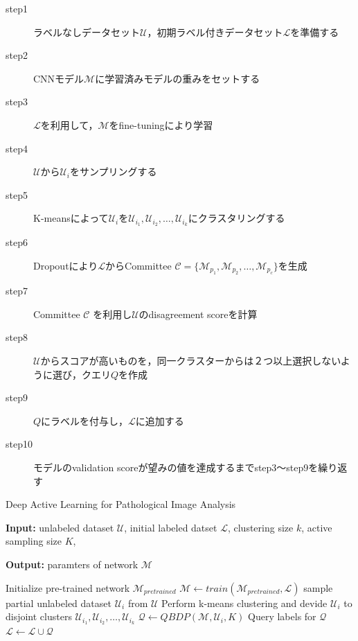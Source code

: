 \begin{description}
    \item[step1] ラベルなしデータセット$\mathcal{U}$，初期ラベル付きデータセット$\mathcal{L}$を準備する
    \item[step2] CNNモデル$\mathcal{M}$に学習済みモデルの重みをセットする
    \item[step3] $\mathcal{L}$を利用して，$\mathcal{M}$をfine-tuningにより学習
    \item[step4] $\mathcal{U}$から$\mathcal{U}_i$をサンプリングする
    \item[step5] K-meansによって$\mathcal{U}_i$を$\mathcal{U}_{i_1}, \mathcal{U}_{i_2}, \dots, \mathcal{U}_{i_k}$にクラスタリングする
    \item[step6] Dropoutにより$\mathcal{L}$からCommittee $\mathcal{C} = \{\mathcal{M}_{p_1}, \mathcal{M}_{p_2}, \dots, \mathcal{M}_{p_c} \}$を生成
    \item[step7] Committee $\mathcal{C}$ を利用し$\mathcal{U}$のdisagreement scoreを計算
    \item[step8] $\mathcal{U}$からスコアが高いものを，同一クラスターからは２つ以上選択しないように選び，クエリ$Q$を作成
    \item[step9] $Q$にラベルを付与し，$\mathcal{L}$に追加する
    \item[step10] モデルのvalidation scoreが望みの値を達成するまでstep3〜step9を繰り返す
\end{description}


\begin{algorithm}[h]
    \caption{Deep Active Learning for Pathological Image Analysis}
    \label{algo:dal}
    \begin{algorithmic}
        \STATE \textbf{Input: } 
        unlabeled dataset $\mathcal{U}$,
        initial labeled datset $\mathcal{L}$,
        clustering size $k$, 
        active sampling size $K$,
    \end{algorithmic}

    \begin{algorithmic}
        \STATE \textbf{Output: } paramters of network $\mathcal{M}$
    \end{algorithmic}

    \begin{algorithmic}[1]
        \STATE Initialize pre-trained network $\mathcal{M}_{pretrained}$
        \REPEAT
            \STATE $\mathcal{M} \leftarrow train (\mathcal{M}_{pretrained}, \mathcal{L})$
            \STATE sample partial unlabeled dataset $\mathcal{U}_i$ from $\mathcal{U}$
            \STATE Perform k-means clustering and devide $\mathcal{U}_i$ to disjoint clusters $\mathcal{U}_{i_1}, \mathcal{U}_{i_2}, \dots, \mathcal{U}_{i_k}$
            \STATE $\mathcal{Q} \leftarrow QBDP(\mathcal{M}, \mathcal{U}_i, K)$
            \STATE Query labels for $\mathcal{Q}$
            \STATE $\mathcal{L} \leftarrow \mathcal{L} \cup \mathcal{Q}$

    \end{algorithmic}
  \end{algorithm}
  
